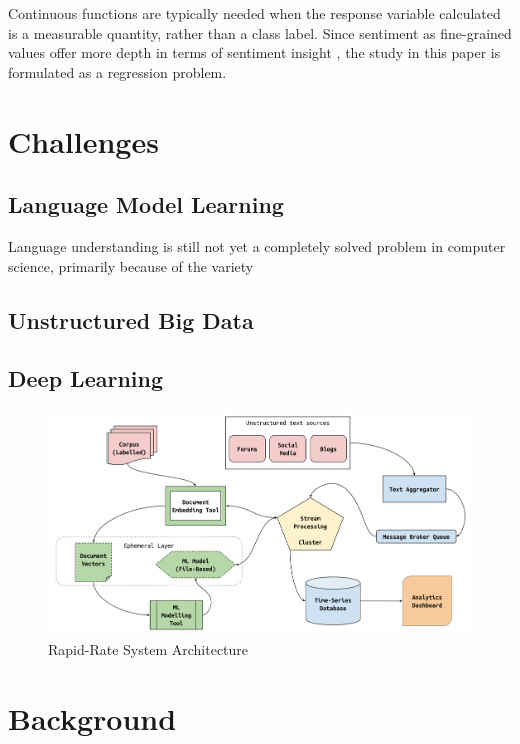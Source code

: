 \documentclass[conference]{IEEEtran}
\begin{document}
    Continuous functions are typically needed when the response variable calculated is a measurable quantity, rather than a class label. Since sentiment as fine-grained values offer more depth in terms of sentiment insight \cite{drake2008sentiment}, the study in this paper is formulated as a regression problem.

\vspace{5mm}

\section{Challenges}

    \subsection{Language Model Learning}
    Language understanding is still not yet a completely solved problem in computer science, primarily because of the variety

    \subsection{Unstructured Big Data}

    \subsection{Deep Learning}

\vspace{5mm}

\begin{figure}[ht]
\centering
\includegraphics[width=\textwidth]{images/rapid_rate_system_arch_1.png}
\caption{Rapid-Rate System Architecture}
\label{fig:system-architecture}
\end{figure}

\section{Background}
\end{document}
